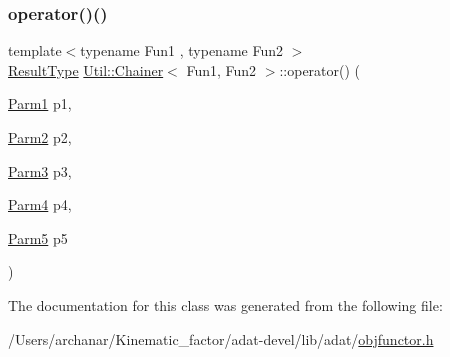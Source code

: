 \subsubsection{\texorpdfstring{operator()()}{operator()()}\hspace{0.1cm}{\footnotesize\ttfamily [18/18]}}
{\footnotesize\ttfamily template$<$typename Fun1 , typename Fun2 $>$ \\
\mbox{\hyperlink{classUtil_1_1Chainer_a2c8d88a77b8ba93eb915dc799ddafbb9}{Result\+Type}} \mbox{\hyperlink{classUtil_1_1Chainer}{Util\+::\+Chainer}}$<$ Fun1, Fun2 $>$\+::operator() (\begin{DoxyParamCaption}\item[{\mbox{\hyperlink{classUtil_1_1Chainer_a3e09b2267dabdd8d12070b09c47749c6}{Parm1}}}]{p1,  }\item[{\mbox{\hyperlink{classUtil_1_1Chainer_a1bfb0e8f35679278c85d232a74a107ff}{Parm2}}}]{p2,  }\item[{\mbox{\hyperlink{classUtil_1_1Chainer_ac28811d7153f7b7cf837f7b8626436c8}{Parm3}}}]{p3,  }\item[{\mbox{\hyperlink{classUtil_1_1Chainer_a82e756f3083e3883a05644425474f789}{Parm4}}}]{p4,  }\item[{\mbox{\hyperlink{classUtil_1_1Chainer_ac5fdddd223aac1cfb37abd6d681ddf69}{Parm5}}}]{p5 }\end{DoxyParamCaption})\hspace{0.3cm}{\ttfamily [inline]}}



The documentation for this class was generated from the following file\+:\begin{DoxyCompactItemize}
\item 
/\+Users/archanar/\+Kinematic\+\_\+factor/adat-\/devel/lib/adat/\mbox{\hyperlink{adat-devel_2lib_2adat_2objfunctor_8h}{objfunctor.\+h}}\end{DoxyCompactItemize}
